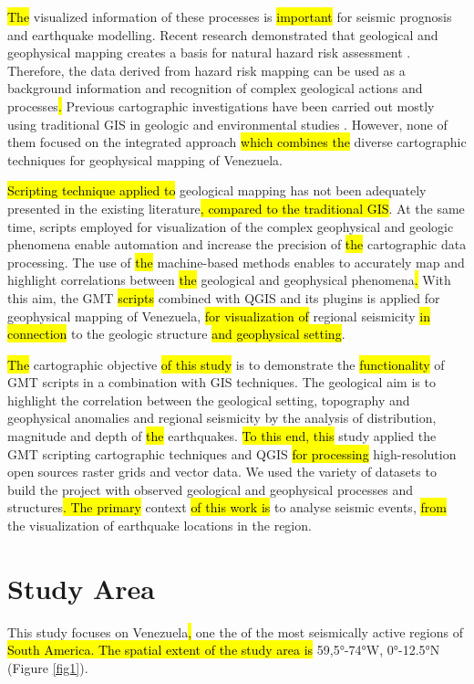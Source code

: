 \documentclass[sustainability,article,submit,pdftex,moreauthors]{Definitions/mdpi}
\begin{document}
\hl{The }visualized information of these processes is \hl{important }for seismic prognosis and earthquake modelling. Recent research demonstrated that geological and geophysical mapping creates a basis for natural hazard risk assessment \cite{su10020304,su131810232,Lemenkova202212,app11219919,ijgi10030118}. Therefore, the data derived from hazard risk mapping can be used as a background information and recognition of complex geological actions and processes\hl{. }Previous cartographic investigations have been carried out mostly using traditional GIS in geologic and environmental studies \citep{Gonzalez,Hackley,Schmitz2021,Sun}. However, none of them focused on the integrated approach \hl{which combines the }diverse cartographic techniques for geophysical mapping of Venezuela. 

\hl{Scripting technique applied to }geological mapping has not been adequately presented in the existing literature\hl{, compared to the traditional GIS}. At the same time, scripts\hl{ }employed for visualization of the complex geophysical and geologic phenomena enable automation\hl{ }and increase the precision of \hl{the }cartographic data processing. The use of \hl{the }machine-based methods enables to accurately map and highlight\hl{ }correlations between \hl{the }geological and geophysical phenomena\hl{. }With this aim, the GMT \hl{scripts }combined with QGIS and its plugins\hl{ }is applied for geophysical mapping of Venezuela, \hl{for visualization of }regional seismicity \hl{in connection }to the geologic structure \hl{and geophysical setting}. 

\hl{The }cartographic objective \hl{of this study }is to demonstrate the \hl{functionality }of GMT scripts in a combination with GIS techniques. The geological aim is to highlight the correlation between the geological setting, topography and geophysical anomalies and regional seismicity by the analysis of distribution, magnitude and depth of \hl{the }earthquakes. \hl{To this end, this }study applied the GMT scripting cartographic techniques and QGIS \hl{for processing }high-resolution open sources raster grids and vector data. We used the variety of datasets to build the project with observed geological and geophysical processes and structures\hl{. The primary }context \hl{of this work is }to analyse seismic events, \hl{from }the visualization of earthquake locations\hl{ }in the region. 

\section{Study Area}
This study focuses on Venezuela\hl{, }one the of the most seismically active regions\hl{ }of \hl{South America. The spatial extent of the study area is} 59,5°-74°W, 0°-12.5°N\hl{ }(Figure \ref{fig1}). 
\end{document}
